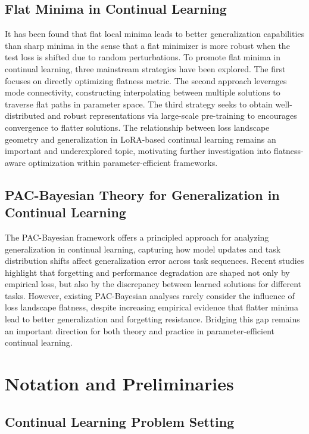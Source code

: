 \documentclass[letterpaper]{article} %
\begin{document}
\subsection{Flat Minima in Continual Learning}
It has been found that flat local minima leads to better generalization capabilities than sharp minima in the sense that a flat minimizer is more robust when the test loss is shifted due to random perturbations. To promote flat minima in continual learning, three mainstream strategies have been explored. The first focuses on directly optimizing flatness metric. The second approach leverages mode connectivity, constructing interpolating between multiple solutions to traverse flat paths in parameter space. The third strategy seeks to obtain well-distributed and robust representations via large-scale pre-training to encourages convergence to flatter solutions. The relationship between loss landscape geometry and generalization in LoRA-based continual learning remains an important and underexplored topic, motivating further investigation into flatness-aware optimization within parameter-efficient frameworks.


\subsection{PAC-Bayesian Theory for Generalization in Continual Learning}

The PAC-Bayesian framework offers a principled approach for analyzing generalization in continual learning, capturing how model updates and task distribution shifts affect generalization error across task sequences. Recent studies highlight that forgetting and performance degradation are shaped not only by empirical loss, but also by the discrepancy between learned solutions for different tasks. However, existing PAC-Bayesian analyses rarely consider the influence of loss landscape flatness, despite increasing empirical evidence that flatter minima lead to better generalization and forgetting resistance. Bridging this gap remains an important direction for both theory and practice in parameter-efficient continual learning.

\section{Notation and Preliminaries}

\subsection{Continual Learning Problem Setting }
\end{document}
